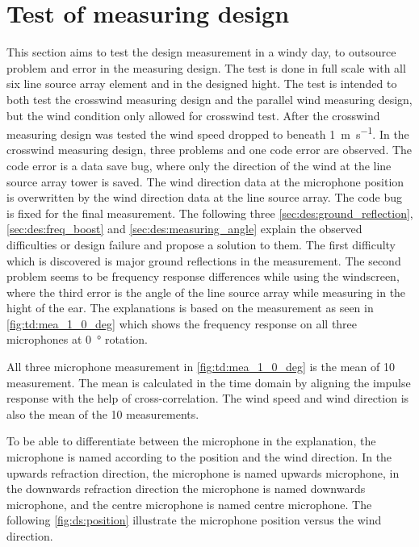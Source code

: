 \section{Test of measuring design}\label{sec:ds:test_of_mes_des}
This section aims to test the design measurement in a windy day, to outsource problem and error in the measuring design. The test is done in full scale with all six line source array element and in the designed hight. The test is intended to both test the crosswind measuring design and the parallel wind measuring design, but the wind condition only allowed for crosswind test. After the crosswind measuring design was tested the wind speed dropped to beneath \SI{1}{\meter\per\second}.
In the crosswind measuring design, three problems and one code error are observed. The code error is a data save bug, where only the direction of the wind at the line source array tower is saved. The wind direction data at the microphone position is overwritten by the wind direction data at the line source array. The code bug is fixed for the final measurement. The following three \autoref{sec:des:ground_reflection}, \autoref{sec:des:freq_boost} and \autoref{sec:des:measuring_angle} explain the observed difficulties or design failure and propose a solution to them. 
The first difficulty which is discovered is major ground reflections in the measurement. The second problem seems to be frequency response differences while using the windscreen, where the third error is the angle of the line source array while measuring in the hight of the ear.  
The explanations is based on the measurement as seen in \autoref{fig:td:mea_1_0_deg} which shows the frequency response on all three microphones at \SI{0}{\degree} rotation.


All three microphone measurement in \autoref{fig:td:mea_1_0_deg} is the mean of 10 measurement. The mean is calculated in the time domain by aligning the impulse response with the help of cross-correlation. The wind speed and wind direction is also the mean of the 10 measurements. 

To be able to differentiate between the microphone in the explanation, the microphone is named according to the position and the wind direction. In the upwards refraction direction, the microphone is named upwards microphone, in the downwards refraction direction the microphone is named downwards microphone, and the centre microphone is named centre microphone. The following \autoref{fig:ds:position} illustrate the microphone position versus the wind direction.

